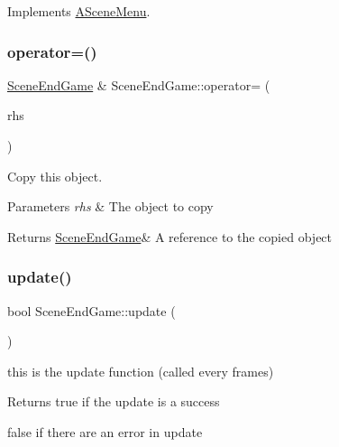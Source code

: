 Implements \hyperlink{class_a_scene_menu_a78bdee98bd7df224524586a060f9bdec}{A\+Scene\+Menu}.

\mbox{\label{class_scene_end_game_a0b750f722b6820cf3cfe455b42c9a5d8}} 
\subsubsection{\texorpdfstring{operator=()}{operator=()}}
{\footnotesize\ttfamily \hyperlink{class_scene_end_game}{Scene\+End\+Game} \& Scene\+End\+Game\+::operator= (\begin{DoxyParamCaption}\item[{\hyperlink{class_scene_end_game}{Scene\+End\+Game} const \&}]{rhs }\end{DoxyParamCaption})}



Copy this object. 


\begin{DoxyParams}{Parameters}
{\em rhs} & The object to copy \\
\hline
\end{DoxyParams}
\begin{DoxyReturn}{Returns}
\hyperlink{class_scene_end_game}{Scene\+End\+Game}\& A reference to the copied object 
\end{DoxyReturn}
\mbox{\label{class_scene_end_game_a36b55558e75b9cad9d17a28d8a1ce8d2}} 
\subsubsection{\texorpdfstring{update()}{update()}}
{\footnotesize\ttfamily bool Scene\+End\+Game\+::update (\begin{DoxyParamCaption}{ }\end{DoxyParamCaption})\hspace{0.3cm}{\ttfamily [virtual]}}



this is the update function (called every frames) 

\begin{DoxyReturn}{Returns}
true if the update is a success 

false if there are an error in update 
\end{DoxyReturn}


